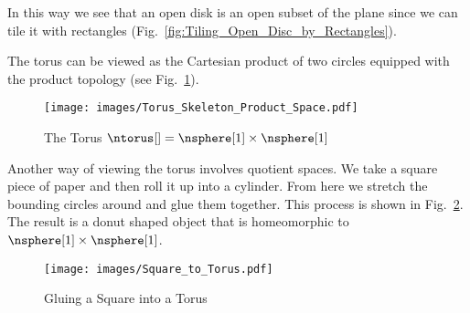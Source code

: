 \documentclass{book}                                                           %
\begin{document}
                \hfill
                \par\vspace{2.5ex}
                In this way we see that an open disk is an open subset of the
                plane since we can tile it with rectangles
                (Fig.~\ref{fig:Tiling_Open_Disc_by_Rectangles}).
                \begin{example}
                    The torus can be viewed as the Cartesian product of two
                    circles equipped with the product topology
                    (see Fig.~\ref{fig:Torus_as_Prod_Space}).
                \end{example}
                \begin{figure}[H]
                    \centering
                    \captionsetup{type=figure}
                    \texttt{[image: images/Torus\_Skeleton\_Product\_Space.pdf]}
                    \caption{The Torus $\ntorus[]=\nsphere[1]\times\nsphere[1]$}
                    \label{fig:Torus_as_Prod_Space}
                \end{figure}
                Another way of viewing the torus involves quotient spaces. We
                take a square piece of paper and then roll it up into a
                cylinder. From here we stretch the bounding circles around and
                glue them together. This process is shown in
                Fig.~\ref{fig:Square_to_Torus}. The result is a donut shaped
                object that is homeomorphic to $\nsphere[1]\times\nsphere[1]$.
                \begin{figure}[H]
                    \centering
                    \captionsetup{type=figure}
                    \texttt{[image: images/Square\_to\_Torus.pdf]}
                    \caption{Gluing a Square into a Torus}
                    \label{fig:Square_to_Torus}
                \end{figure}
\end{document}
